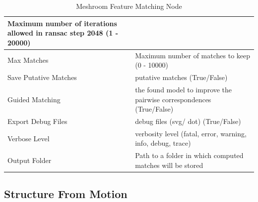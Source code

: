 \documentclass[12pt]{report}
\begin{document}
\begin{table}[h!]
{\begin{tabular}{|l|l|}
    Maximum number of iterations allowed in ransac step 2048 (1 - 20000) \\ \hline
  Max Matches &
    Maximum number of matches to keep (0 - 10000) \\ \hline
  Save Putative Matches &
    putative matches (True/False) \\ \hline
  Guided Matching &
    the found model to improve the pairwise correspondences (True/False) \\ \hline
  Export Debug Files &
    debug files (svg/ dot) (True/False) \\ \hline
  Verbose Level &
    verbosity level (fatal, error, warning, info, debug, trace) \\ \hline
  Output Folder &
    Path to a folder in which computed matches will be stored \\ \hline
  \end{tabular}%
  }
  \caption{Meshroom Feature Matching Node}
  \label{tab:FeatureMatching}
  \end{table}

\subsection{Structure From Motion}
\end{document}
